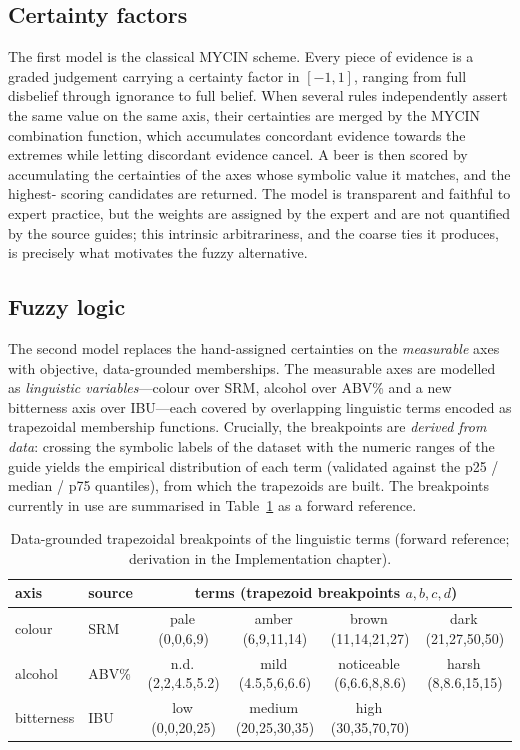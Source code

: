 \subsection{Certainty factors}

The first model is the classical MYCIN scheme. Every piece of evidence is a
graded judgement carrying a certainty factor in $[-1,1]$, ranging from full
disbelief through ignorance to full belief. When several rules independently
assert the same value on the same axis, their certainties are merged by the MYCIN
combination function, which accumulates concordant evidence towards the extremes
while letting discordant evidence cancel. A beer is then scored by accumulating
the certainties of the axes whose symbolic value it matches, and the highest-%
scoring candidates are returned. The model is transparent and faithful to expert
practice, but the weights are assigned by the expert and are not quantified by
the source guides; this intrinsic arbitrariness, and the coarse ties it produces,
is precisely what motivates the fuzzy alternative.

\subsection{Fuzzy logic}

The second model replaces the hand-assigned certainties on the \emph{measurable}
axes with objective, data-grounded memberships. The measurable axes are modelled
as \emph{linguistic variables}---colour over SRM, alcohol over ABV\% and a new
bitterness axis over IBU---each covered by overlapping linguistic terms encoded
as trapezoidal membership functions. Crucially, the breakpoints are
\emph{derived from data}: crossing the symbolic labels of the dataset with the
numeric ranges of the guide yields the empirical distribution of each term
(validated against the p25 / median / p75 quantiles), from which the trapezoids
are built. The breakpoints currently in use are summarised in
Table~\ref{tab:trapezoids} as a forward reference.

\begin{table}[ht]
\centering\small
\caption{Data-grounded trapezoidal breakpoints of the linguistic terms (forward
reference; derivation in the Implementation chapter).}\label{tab:trapezoids}
\begin{tabular}{llcccc}
\toprule
axis & source & \multicolumn{4}{c}{terms (trapezoid breakpoints $a,b,c,d$)}\\
\midrule
colour & SRM & pale\,(0,0,6,9) & amber\,(6,9,11,14) & brown\,(11,14,21,27) & dark\,(21,27,50,50)\\
alcohol & ABV\% & n.d.\,(2,2,4.5,5.2) & mild\,(4.5,5,6,6.6) & noticeable\,(6,6.6,8,8.6) & harsh\,(8,8.6,15,15)\\
bitterness & IBU & low\,(0,0,20,25) & medium\,(20,25,30,35) & high\,(30,35,70,70) &\\
\bottomrule
\end{tabular}
\end{table}


